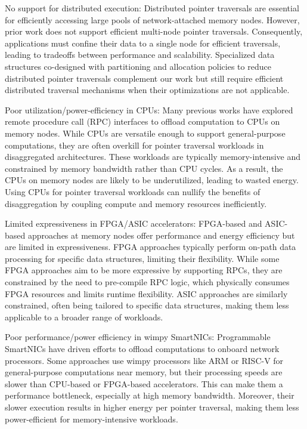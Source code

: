 No support for distributed execution: Distributed pointer traversals are essential for efficiently accessing large pools of network-attached memory nodes. However, prior work does not support efficient multi-node pointer traversals. Consequently, applications must confine their data to a single node for efficient traversals, leading to tradeoffs between performance and scalability. Specialized data structures co-designed with partitioning and allocation policies to reduce distributed pointer traversals complement our work but still require efficient distributed traversal mechanisms when their optimizations are not applicable.

Poor utilization/power-efficiency in CPUs: Many previous works have explored remote procedure call (RPC) interfaces to offload computation to CPUs on memory nodes. While CPUs are versatile enough to support general-purpose computations, they are often overkill for pointer traversal workloads in disaggregated architectures. These workloads are typically memory-intensive and constrained by memory bandwidth rather than CPU cycles. As a result, the CPUs on memory nodes are likely to be underutilized, leading to wasted energy. Using CPUs for pointer traversal workloads can nullify the benefits of disaggregation by coupling compute and memory resources inefficiently.

Limited expressiveness in FPGA/ASIC accelerators: FPGA-based and ASIC-based approaches at memory nodes offer performance and energy efficiency but are limited in expressiveness. FPGA approaches typically perform on-path data processing for specific data structures, limiting their flexibility. While some FPGA approaches aim to be more expressive by supporting RPCs, they are constrained by the need to pre-compile RPC logic, which physically consumes FPGA resources and limits runtime flexibility. ASIC approaches are similarly constrained, often being tailored to specific data structures, making them less applicable to a broader range of workloads.

Poor performance/power efficiency in wimpy SmartNICs: Programmable SmartNICs have driven efforts to offload computations to onboard network processors. Some approaches use wimpy processors like ARM or RISC-V for general-purpose computations near memory, but their processing speeds are slower than CPU-based or FPGA-based accelerators. This can make them a performance bottleneck, especially at high memory bandwidth. Moreover, their slower execution results in higher energy per pointer traversal, making them less power-efficient for memory-intensive workloads.









